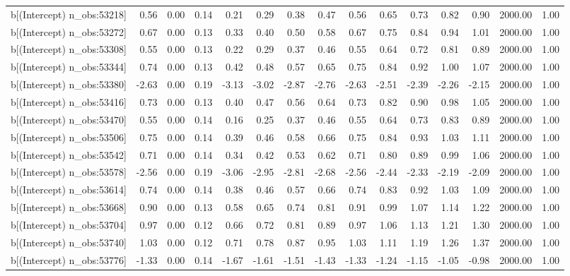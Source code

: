 \begin{table}[ht]
\begin{tabular}{rrrrrrrrrrrrrrr}
  b[(Intercept) n\_obs:53218] & 0.56 & 0.00 & 0.14 & 0.21 & 0.29 & 0.38 & 0.47 & 0.56 & 0.65 & 0.73 & 0.82 & 0.90 & 2000.00 & 1.00 \\ 
  b[(Intercept) n\_obs:53272] & 0.67 & 0.00 & 0.13 & 0.33 & 0.40 & 0.50 & 0.58 & 0.67 & 0.75 & 0.84 & 0.94 & 1.01 & 2000.00 & 1.00 \\ 
  b[(Intercept) n\_obs:53308] & 0.55 & 0.00 & 0.13 & 0.22 & 0.29 & 0.37 & 0.46 & 0.55 & 0.64 & 0.72 & 0.81 & 0.89 & 2000.00 & 1.00 \\ 
  b[(Intercept) n\_obs:53344] & 0.74 & 0.00 & 0.13 & 0.42 & 0.48 & 0.57 & 0.65 & 0.75 & 0.84 & 0.92 & 1.00 & 1.07 & 2000.00 & 1.00 \\ 
  b[(Intercept) n\_obs:53380] & -2.63 & 0.00 & 0.19 & -3.13 & -3.02 & -2.87 & -2.76 & -2.63 & -2.51 & -2.39 & -2.26 & -2.15 & 2000.00 & 1.00 \\ 
  b[(Intercept) n\_obs:53416] & 0.73 & 0.00 & 0.13 & 0.40 & 0.47 & 0.56 & 0.64 & 0.73 & 0.82 & 0.90 & 0.98 & 1.05 & 2000.00 & 1.00 \\ 
  b[(Intercept) n\_obs:53470] & 0.55 & 0.00 & 0.14 & 0.16 & 0.25 & 0.37 & 0.46 & 0.55 & 0.64 & 0.73 & 0.83 & 0.89 & 2000.00 & 1.00 \\ 
  b[(Intercept) n\_obs:53506] & 0.75 & 0.00 & 0.14 & 0.39 & 0.46 & 0.58 & 0.66 & 0.75 & 0.84 & 0.93 & 1.03 & 1.11 & 2000.00 & 1.00 \\ 
  b[(Intercept) n\_obs:53542] & 0.71 & 0.00 & 0.14 & 0.34 & 0.42 & 0.53 & 0.62 & 0.71 & 0.80 & 0.89 & 0.99 & 1.06 & 2000.00 & 1.00 \\ 
  b[(Intercept) n\_obs:53578] & -2.56 & 0.00 & 0.19 & -3.06 & -2.95 & -2.81 & -2.68 & -2.56 & -2.44 & -2.33 & -2.19 & -2.09 & 2000.00 & 1.00 \\ 
  b[(Intercept) n\_obs:53614] & 0.74 & 0.00 & 0.14 & 0.38 & 0.46 & 0.57 & 0.66 & 0.74 & 0.83 & 0.92 & 1.03 & 1.09 & 2000.00 & 1.00 \\ 
  b[(Intercept) n\_obs:53668] & 0.90 & 0.00 & 0.13 & 0.58 & 0.65 & 0.74 & 0.81 & 0.91 & 0.99 & 1.07 & 1.14 & 1.22 & 2000.00 & 1.00 \\ 
  b[(Intercept) n\_obs:53704] & 0.97 & 0.00 & 0.12 & 0.66 & 0.72 & 0.81 & 0.89 & 0.97 & 1.06 & 1.13 & 1.21 & 1.30 & 2000.00 & 1.00 \\ 
  b[(Intercept) n\_obs:53740] & 1.03 & 0.00 & 0.12 & 0.71 & 0.78 & 0.87 & 0.95 & 1.03 & 1.11 & 1.19 & 1.26 & 1.37 & 2000.00 & 1.00 \\ 
  b[(Intercept) n\_obs:53776] & -1.33 & 0.00 & 0.14 & -1.67 & -1.61 & -1.51 & -1.43 & -1.33 & -1.24 & -1.15 & -1.05 & -0.98 & 2000.00 & 1.00 \\ 

\end{tabular}
\end{table}
